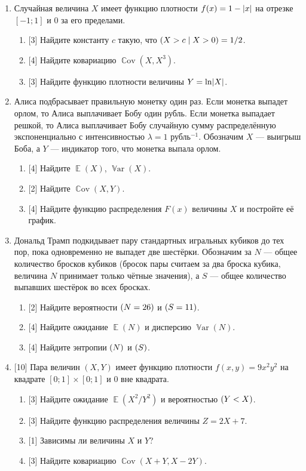 \documentclass[12pt]{article}
\DeclareMathOperator{\Cov}{\mathbb{C}ov}
\DeclareMathOperator{\Var}{\mathbb{V}ar}
\let\P\relax
\DeclareMathOperator{\P}{\mathbb{P}}
\let\H\relax
\DeclareMathOperator{\H}{\mathbb{H}}
\DeclareMathOperator{\E}{\mathbb{E}}
\DeclarePairedDelimiter{\abs}{\lvert}{\rvert}
\begin{document}
\begin{enumerate}

    \item Случайная величина $X$ имеет функцию плотности $f(x) = 1 - \abs{x}$ на отрезке $[-1;1]$ и $0$ за его пределами.
    \begin{enumerate}
        \item {[3]} Найдите константу $c$ такую, что $\P(X > c \mid X > 0) = 1/2$.
        \item {[4]} Найдите ковариацию $\Cov(X, X^3)$.
        \item {[3]} Найдите функцию плотности величины $Y = \ln \abs{X}$.
    \end{enumerate}

    
    \item Алиса подбрасывает правильную монетку один раз. 
    Если монетка выпадет орлом, то Алиса выплачивает Бобу один рубль. 
    Если монетка выпадает решкой, то Алиса выплачивает Бобу случайную сумму распределённую экспоненциально с интенсивностью $\lambda = 1$ рубль$^{-1}$. 
    Обозначим $X$ — выигрыш Боба, а $Y$ — индикатор того, что монетка выпала орлом.
    \begin{enumerate}
        \item {[4]} Найдите $\E(X)$, $\Var(X)$.
        \item {[2]} Найдите $\Cov(X, Y)$.
        \item {[4]} Найдите функцию распределения $F(x)$ величины $X$ и постройте её график.
    \end{enumerate}

    \item  Дональд Трамп подкидывает пару стандартных игральных кубиков до тех пор, пока одновременно не выпадет две шестёрки.
    Обозначим за $N$ — общее количество бросков кубиков (бросок пары считаем за два броска кубика, величина $N$ принимает только чётные значения), а $S$ — общее количество выпавших шестёрок во всех бросках. 
    \begin{enumerate}
        \item {[2]} Найдите вероятности $\P(N = 26)$ и $\P(S = 11)$.
        \item {[4]} Найдите ожидание $\E(N)$ и дисперсию $\Var(N)$.
        \item {[4]} Найдите энтропии $\H(N)$ и $\H(S)$.
    \end{enumerate}


    \item {[10]} Пара величин $(X, Y)$ имеет функцию плотности $f(x, y) = 9x^2y^2$ на квадрате $[0;1]\times [0;1]$ и $0$ вне квадрата. 
    \begin{enumerate}
        \item {[3]} Найдите ожидание $\E(X^2 / Y^2)$ и вероятностью $\P(Y < X)$.
        \item {[3]} Найдите функцию распределения величины $Z = 2X + 7$.
        \item {[1]} Зависимы ли величины $X$ и $Y$?
        \item {[3]} Найдите ковариацию $\Cov(X + Y, X - 2Y)$.
    \end{enumerate}




\end{enumerate}
\end{document}
